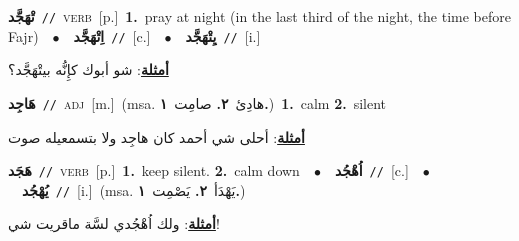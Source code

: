\documentclass[10pt,a4paper,twoside]{article} %
\begin{document}
\begin{multicols}{2}
{\setlength\topsep{0pt}\textbf{\foreignlanguage{arabic}{تْهَجَّد}}\ {\color{gray}\texttt{//}\color{black}}\ \textsc{verb}\ [p.]\ \textbf{1.}~pray at night (in the last third of the night, the time before Fajr)\ \ $\bullet$\ \ \setlength\topsep{0pt}\textbf{\foreignlanguage{arabic}{اِتْهَجَّد}}\ {\color{gray}\texttt{//}\color{black}}\ [c.]\ \ $\bullet$\ \ \setlength\topsep{0pt}\textbf{\foreignlanguage{arabic}{يِتْهَجَّد}}\ {\color{gray}\texttt{//}\color{black}}\ [i.]\  \begin{flushright}\color{gray}\foreignlanguage{arabic}{\textbf{\underline{\foreignlanguage{arabic}{أمثلة}}}: شو أبوك كإِنُّه بيتْهَجَّد؟}\end{flushright}\color{black}} \vspace{2mm}

{\setlength\topsep{0pt}\textbf{\foreignlanguage{arabic}{هَاجِد}}\ {\color{gray}\texttt{//}\color{black}}\ \textsc{adj}\ [m.]\ \color{gray}(msa. \foreignlanguage{arabic}{هادِئ}~\foreignlanguage{arabic}{\textbf{٢.}}  \foreignlanguage{arabic}{صامِت}~\foreignlanguage{arabic}{\textbf{١.}})\color{black}\ \textbf{1.}~calm  \textbf{2.}~silent\  \begin{flushright}\color{gray}\foreignlanguage{arabic}{\textbf{\underline{\foreignlanguage{arabic}{أمثلة}}}: أحلى شي أحمد كان هاجِد ولا بتسمعيله صوت}\end{flushright}\color{black}} \vspace{2mm}

{\setlength\topsep{0pt}\textbf{\foreignlanguage{arabic}{هَجَد}}\ {\color{gray}\texttt{//}\color{black}}\ \textsc{verb}\ [p.]\ \textbf{1.}~keep silent.  \textbf{2.}~calm down\ \ $\bullet$\ \ \setlength\topsep{0pt}\textbf{\foreignlanguage{arabic}{اُهْجُد}}\ {\color{gray}\texttt{//}\color{black}}\ [c.]\ \ $\bullet$\ \ \setlength\topsep{0pt}\textbf{\foreignlanguage{arabic}{يُهْجُد}}\ {\color{gray}\texttt{//}\color{black}}\ [i.]\ \color{gray}(msa. \foreignlanguage{arabic}{يَهْدَأ}~\foreignlanguage{arabic}{\textbf{٢.}}  \foreignlanguage{arabic}{يَصْمِت}~\foreignlanguage{arabic}{\textbf{١.}})\color{black}\  \begin{flushright}\color{gray}\foreignlanguage{arabic}{\textbf{\underline{\foreignlanguage{arabic}{أمثلة}}}: ولك اُهْجُدي لسَّة ماقريت شي!}\end{flushright}\color{black}} \vspace{2mm}


\end{multicols}
\end{document}
